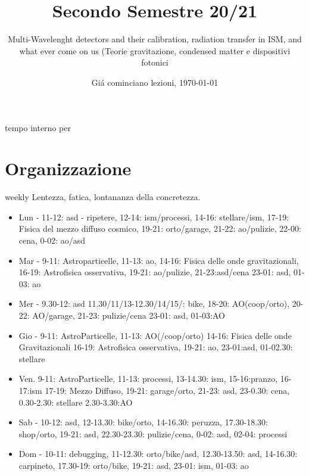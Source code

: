 \documentclass[10pt,xcolor={usenames},fleqn,mathserif,serif]{beamer}
\title{Secondo Semestre 20/21}
\subtitle{Multi-Wavelenght detectors and their calibration, radiation transfer in ISM, and what ever come on us (Teorie gravitazione, condensed matter e dispositivi fotonici}
\date{Gi\'a cominciano lezioni, \today}
\begin{document}


\begin{frame}
  \titlepage
\end{frame}

\begin{frame}{tempo interno per}
\tableofcontents[onlyparts]
\end{frame}


\part{Organizzazione}

\begin{frame}{weekly}
Lentezza, fatica, lontananza della concretezza. 
\begin{itemize}
    \item Lun - 11-12: asd - ripetere, 12-14: ism/processi, 14-16: stellare/ism, 17-19: Fisica del mezzo diffuso cosmico, 19-21: orto/garage, 21-22: ao/pulizie, 22-00: cena, 0-02: ao/asd
    \item Mar - 9-11: Astroparticelle, 11-13: ao, 14-16: Fisica delle onde gravitazionali, 16-19: Astrofisica osservativa, 19-21: ao/pulizie, 21-23:asd/cena 23-01: asd, 01-03: ao
    \item Mer - 9.30-12: asd 11.30/11/13-12.30/14/15/: bike, 18-20: AO(coop/orto), 20-22: AO/garage, 21-23: pulizie/cena 23-01: asd, 01-03:AO
    \item Gio - 9-11: AstroParticelle, 11-13: AO(/coop/orto) 14-16: Fisica delle onde Gravitazionali 16-19: Astrofisica osservativa, 19-21: ao, 23-01:asd, 01-02.30: stellare
    \item Ven. 9-11: AstroParticelle, 11-13: processi, 13-14.30: ism, 15-16:pranzo, 16-17:ism 17-19: Mezzo Diffuso, 19-21: garage/orto, 21-23: asd, 23-0.30: cena, 0.30-2.30: stellare 2.30-3.30:AO
    \item Sab - 10-12: asd, 12-13.30: bike/orto, 14-16.30: peruzza, 17.30-18.30: shop/orto, 19-21: asd, 22.30-23.30: pulizie/cena, 0-02: asd, 02-04: processi
    \item Dom - 10-11: debugging, 11-12.30: orto/bike/asd, 12.30-13.50: asd, 14-16.30: carpineto, 17.30-19: orto/bike, 19-21: asd, 23-01: ism, 01-03: ao
\end{itemize}
\end{frame}
\end{document}
